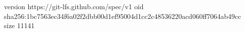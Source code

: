 version https://git-lfs.github.com/spec/v1
oid sha256:1bc7563ec34f6a02f2dbb00d1ef95004d1cc2c48536220acd060ff7064ab49cc
size 11141

